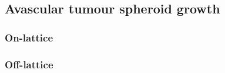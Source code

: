 \documentclass[superscriptaddress, a4paper]{article}
\begin{document}
\subsection{Avascular tumour spheroid growth}
\label{sec:avascular tumour spheroid growth}

\subsubsection{On-lattice}
\label{sec:on-lattice avascular tumour spheroid growth}



\subsubsection{Off-lattice}
\label{sec:off-lattice avascular tumour spheroid growth}
\end{document}
